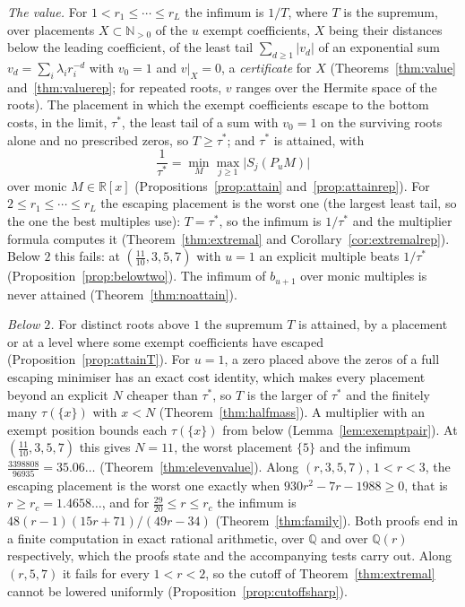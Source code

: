 \documentclass[11pt]{article}
\theoremstyle{definition}
\theoremstyle{plain}
\newcommand{\R}{\mathbb R}
\newcommand{\N}{\mathbb N}
\begin{document}
\emph{The value.}  For $1<r_1\le\cdots\le r_L$ the infimum is $1/T$, where
$T$ is the supremum, over placements $X\subset\N_{>0}$ of the $u$ exempt coefficients, $X$ being
their distances below the leading coefficient, of
the least tail $\sum_{d\ge1}|v_d|$ of an exponential sum
$v_d=\sum_i\lambda_ir_i^{-d}$ with $v_0=1$ and $v|_X=0$, a
\emph{certificate} for $X$
(Theorems~\ref{thm:value} and~\ref{thm:valuerep}; for repeated roots, $v$
ranges over the Hermite space of the roots).  The placement in which
the exempt coefficients escape to the bottom costs, in the limit, $\tau^*$, the
least tail of a sum with $v_0=1$ on the surviving roots alone and no
prescribed zeros, so
$T\ge\tau^*$; and $\tau^*$ is attained, with
\[
  \frac1{\tau^*}=\min_M\max_{j\ge1}\bigl|S_j(P_uM)\bigr|
\]
over monic $M\in\R[x]$ (Propositions~\ref{prop:attain}
and~\ref{prop:attainrep}).  For $2\le r_1\le\cdots\le r_L$ the escaping
placement is the worst one (the largest least tail, so the one the best
multiples use): $T=\tau^*$, so the infimum is $1/\tau^*$ and the
multiplier formula computes it (Theorem~\ref{thm:extremal} and
Corollary~\ref{cor:extremalrep}).  Below $2$ this fails: at
$(\tfrac{11}{10},3,5,7)$ with $u=1$ an explicit multiple beats $1/\tau^*$
(Proposition~\ref{prop:belowtwo}).  The infimum of $b_{u+1}$ over monic
multiples is never attained (Theorem~\ref{thm:noattain}).

\emph{Below $2$.}  For distinct roots above $1$ the supremum $T$ is attained,
by a placement or at a level where some exempt coefficients have escaped
(Proposition~\ref{prop:attainT}).  For $u=1$, a zero placed above the zeros
of a full escaping minimiser has an exact cost identity, which makes every
placement beyond an explicit $N$ cheaper than $\tau^*$, so $T$ is the
larger of $\tau^*$ and the finitely many $\tau(\{x\})$ with $x<N$
(Theorem~\ref{thm:halfmass}).  A multiplier with an exempt position bounds
each $\tau(\{x\})$ from below (Lemma~\ref{lem:exemptpair}).  At
$(\tfrac{11}{10},3,5,7)$ this gives $N=11$, the worst placement $\{5\}$ and
the infimum $\tfrac{3398808}{96935}=35.06\ldots$
(Theorem~\ref{thm:elevenvalue}).  Along $(r,3,5,7)$, $1<r<3$, the escaping
placement is the worst one exactly when $930r^2-7r-1988\ge0$, that is
$r\ge r_c=1.4658\ldots$, and for $\tfrac{29}{20}\le r\le r_c$ the infimum is
$48(r-1)(15r+71)/(49r-34)$ (Theorem~\ref{thm:family}).  Both proofs end in
a finite computation in exact rational arithmetic, over $\mathbb Q$ and
over $\mathbb Q(r)$ respectively, which the proofs state and the
accompanying tests carry out.  Along $(r,5,7)$ it
fails for every $1<r<2$, so the cutoff of Theorem~\ref{thm:extremal} cannot
be lowered uniformly (Proposition~\ref{prop:cutoffsharp}).
\end{document}
